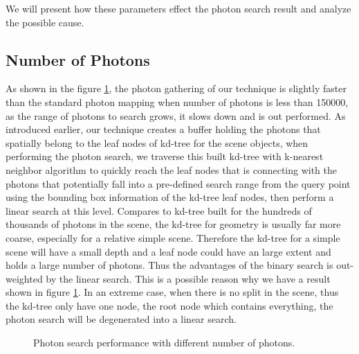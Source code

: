 We will present how these parameters effect the photon search result and analyze the possible cause. 

\subsection{Number of Photons} 

As shown in the figure \ref{fig:photon_search_1}, the photon gathering of our technique is slightly faster than the standard photon mapping when number of photons is less than 150000, as the range of photons to search grows, it slows down and is out performed. As introduced earlier, our technique creates a buffer holding the photons that spatially belong to the leaf nodes of kd-tree for the scene objects, when performing the photon search, we traverse this built kd-tree with k-nearest neighbor algorithm to quickly reach the leaf nodes that is connecting with the photons that potentially fall into a pre-defined search range from the query point using the bounding box information of the kd-tree leaf nodes, then perform a linear search at this level. Compares to kd-tree built for the hundreds of thousands of photons in the scene, the kd-tree for geometry is usually far more coarse, especially for a relative simple scene. Therefore the kd-tree for a simple scene will have a small depth and a leaf node could have an large extent and holds a large number of photons. Thus the advantages of the binary search is out-weighted by the linear search. This is a possible reason why we have a result shown in figure \ref{fig:photon_search_1}. In an extreme case, when there is no split in the scene, thus the kd-tree only have one node, the root node which contains everything, the photon search will be degenerated into a linear search. 

\begin{figure}[ftp] 
    \centering 
    \renewcommand{\thefigure}{\thechapter.\arabic{figure}}
    \caption[]{Photon search performance with different number of photons. }
    \label{fig:photon_search_1}  
\end{figure} 

